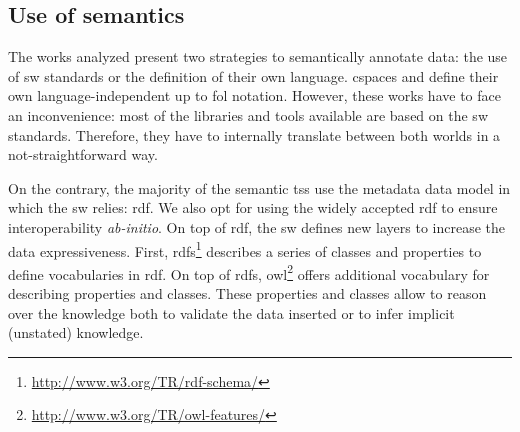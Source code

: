\subsection{Use of semantics}

The works analyzed present two strategies to semantically annotate data: the use of \ac{sw} standards or the definition of their own language.
\ac{cspaces} \citep{martinrecuerda_towards_2005} and \citet{nardini_semantic_2013} define their own language-independent up to \ac{fol} notation.
However, these works have to face an inconvenience: most of the libraries and tools available are based on the \ac{sw} standards. %
Therefore, they have to internally translate between both worlds in a not-straightforward way. %




On the contrary, the majority of the semantic \acp{ts} use the metadata data model in which the \ac{sw} relies: \ac{rdf}. %
We also opt for using the widely accepted \ac{rdf} to ensure interoperability \emph{ab-initio}.
On top of \ac{rdf}, the \ac{sw} defines new layers to increase the data expressiveness.
First, \ac{rdfs}\footnote{\url{http://www.w3.org/TR/rdf-schema/}} describes a series of classes and properties to define vocabularies in \ac{rdf}.
On top of \ac{rdfs}, \ac{owl}\footnote{\url{http://www.w3.org/TR/owl-features/}} offers additional vocabulary for describing properties and classes.
These properties and classes allow to reason over the knowledge both to validate the data inserted or to infer implicit (unstated) knowledge. %


